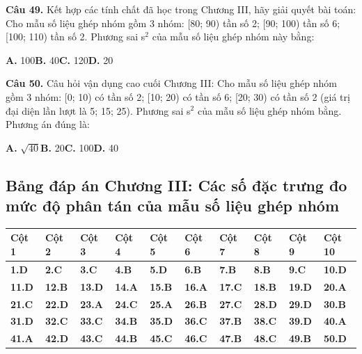 \documentclass[11pt,a4paper]{article}
\begin{document}
\textbf{\color{primary} Câu 49.} Kết hợp các tính chất đã học trong Chương III, hãy giải quyết bài toán: Cho mẫu số liệu ghép nhóm gồm 3 nhóm: [80; 90) tần số 2; [90; 100) tần số 6; [100; 110) tần số 2. Phương sai s$^2$ của mẫu số liệu ghép nhóm này bằng:\par
\hspace*{1.5em}\textbf{A.} 100\quad\quad \textbf{B.} 40\quad\quad \textbf{C.} 120\quad\quad \textbf{D.} 20\par\vspace{2pt}
\textbf{\color{primary} Câu 50.} Câu hỏi vận dụng cao cuối Chương III: Cho mẫu số liệu ghép nhóm gồm 3 nhóm: [0; 10) có tần số 2; [10; 20) có tần số 6; [20; 30) có tần số 2 (giá trị đại diện lần lượt là 5; 15; 25). Phương sai s$^2$ của mẫu số liệu ghép nhóm bằng. Phương án đúng là:\par
\hspace*{1.5em}\textbf{A.} $\sqrt{40}$\quad\quad \textbf{B.} 20\quad\quad \textbf{C.} 100\quad\quad \textbf{D.} 40\par\vspace{2pt}
\subsection*{\color{primary} Bảng đáp án Chương III: Các số đặc trưng đo mức độ phân tán của mẫu số liệu ghép nhóm}
\begin{center}
\renewcommand{\arraystretch}{1.25}
\begin{tabularx}{\textwidth}{*{10}{>{\centering\arraybackslash}X}}
\toprule
\textbf{\color{primary} Cột 1} & \textbf{\color{primary} Cột 2} & \textbf{\color{primary} Cột 3} & \textbf{\color{primary} Cột 4} & \textbf{\color{primary} Cột 5} & \textbf{\color{primary} Cột 6} & \textbf{\color{primary} Cột 7} & \textbf{\color{primary} Cột 8} & \textbf{\color{primary} Cột 9} & \textbf{\color{primary} Cột 10} \\
\midrule
\textbf{1.D} & \textbf{2.C} & \textbf{3.C} & \textbf{4.B} & \textbf{5.D} & \textbf{6.B} & \textbf{7.B} & \textbf{8.B} & \textbf{9.C} & \textbf{10.D} \\
\rowcolor{rowtint} \textbf{11.D} & \textbf{12.B} & \textbf{13.D} & \textbf{14.A} & \textbf{15.B} & \textbf{16.A} & \textbf{17.C} & \textbf{18.B} & \textbf{19.D} & \textbf{20.A} \\
\textbf{21.C} & \textbf{22.D} & \textbf{23.A} & \textbf{24.C} & \textbf{25.A} & \textbf{26.B} & \textbf{27.C} & \textbf{28.D} & \textbf{29.D} & \textbf{30.B} \\
\rowcolor{rowtint} \textbf{31.D} & \textbf{32.C} & \textbf{33.C} & \textbf{34.B} & \textbf{35.D} & \textbf{36.C} & \textbf{37.B} & \textbf{38.C} & \textbf{39.D} & \textbf{40.A} \\
\textbf{41.A} & \textbf{42.D} & \textbf{43.C} & \textbf{44.B} & \textbf{45.C} & \textbf{46.C} & \textbf{47.B} & \textbf{48.C} & \textbf{49.B} & \textbf{50.D} \\
\bottomrule
\end{tabularx}
\end{center}\vspace{10pt}
\end{document}
